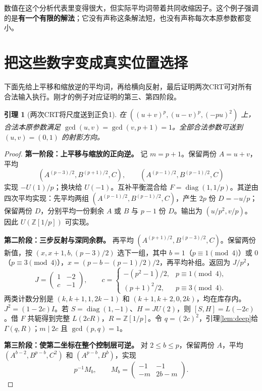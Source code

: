 \documentclass[11pt,a4paper,oneside,openany]{book}
\newcommand{\Z}{\mathbb Z}
\newcommand{\diag}{\operatorname{diag}}
\newtheorem{lemma}[theorem]{引理}
\theoremstyle{definition}
\numberwithin{equation}{chapter}
\begin{document}
数值在这个分析代表里变得很大，但实际平均词带着共同收缩因子。这个例子强调的是\textbf{有一个有限的解法}；它没有声称这条解法短，也没有声称每次本原参数都变小。

\section{把这些数字变成真实位置选择}
下面先给上平移和缩放逆的平均词，再给横向反射，最后证明两次CRT可对所有合法输入执行。刚才的例子对应证明的第三、第四阶段。
\begin{lemma}[两次CRT将尺度送到正负1]\label{lem:two-carrier}
在 $((u+v)^p,(u-v)^p,(-pu)^2)$ 上，合法本原参数满足 $\gcd(u,v)=\gcd(v,p+1)=1$。全部合法参数可送到 $(u,v)=(0,1)$ 的射影方向。
\end{lemma}
\begin{proof}

\par\noindent\textbf{第一阶段：上平移与缩放的正向逆。}
记 $m=p+1$。保留两份 $A=u+v$，平均
\[(A^{(p-3)/2},B^{(p+1)/2},C),\qquad
(A^{(p-1)/2},B^{(p-1)/2},C)
\]
实现 $-U(1)/p$；换块给 $U(-1)$。互补平衡混合给 $F=\diag(1,1/p)$。其逆由四次平均实现：先平均两组 $(A^{(p-1)/2},B^{(p-1)/2},C)$，产生 $2p$ 份 $D=-u/p$；保留两份 $D$，分别平均一份剩余 $A$ 或 $B$ 与 $p-1$ 份 $D$。输出为 $(u/p^2,v/p)$。因此 $U(\Z[1/p])$ 可实现。

\par\noindent\textbf{第二阶段：三步反射与深同余群。}
再平均 $(A^{(p+1)/2},B^{(p-3)/2},C)$。保留两份新值，按 $(x,x+1,b,(p-3)/2)$ 选下一组，其中 $b=1$（$p\equiv1\pmod4$）或 $0$（$p\equiv3\pmod4$），$x=(p-b-(p-1)/2)/2$，再平均补组。返回为 $J/p^2$，
\[
J=\begin{pmatrix}1&-2\\c&-1\end{pmatrix},\qquad
c=\begin{cases}-(p^2-1)/2,&p\equiv1\pmod4,\\(p+1)^2/2,&p\equiv3\pmod4.
\end{cases}
\]
两类计数分别是 $(k,k+1,1,2k-1)$ 和 $(k+1,k+2,0,2k)$，均在库存内。$J^2=(1-2c)I$。若 $S=\diag(1,-1)$、$H=JU(2)$，则 $[S,H]=L(-2c)$。借 $F$ 共轭得到完整 $L(2cR)$，$R=\Z[1/p]$。令 $q=(2c)^2$，引理\ref{lem:deep}给 $\Gamma(q,R)$；$m\mid2c$ 且 $\gcd(p,q)=1$。


\par\noindent\textbf{第三阶段：使第二坐标在整个控制层可逆。}
对 $2\le b\le p$，保留两份 $A$，平均 $(A^{b-2},B^{p-b},C^2)$ 和 $(A^{p-b},B^b)$，实现
\[
p^{-1}M_b,\qquad M_b=\begin{pmatrix}-1&-1\\-m&2b-m\end{pmatrix}.
\]


\end{proof}
\end{document}
